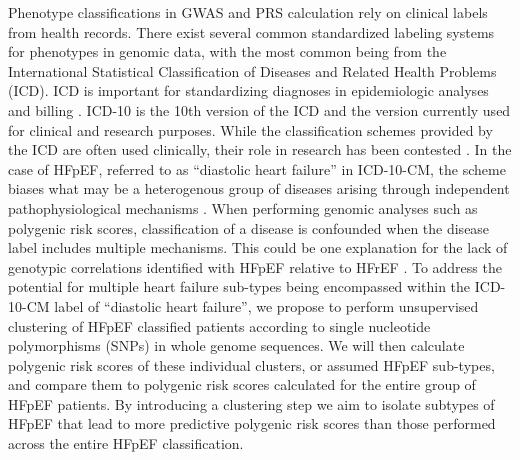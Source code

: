 \documentclass[11pt]{article}  %
\begin{document}
Phenotype classifications in GWAS and PRS calculation rely on clinical labels from health records. There exist several common standardized labeling systems for phenotypes in genomic data, with the most common being from the International Statistical Classification of Diseases and Related Health Problems (ICD). ICD is important for standardizing diagnoses in epidemiologic analyses and billing \cite{steindel_international_2010}. ICD-10 is the 10th version of the ICD and the version currently used for clinical and research purposes. While the classification schemes provided by the ICD are often used clinically, their role in research has been contested \cite{weiner_point_2018, cox_good_2009}. In the case of HFpEF, referred to as “diastolic heart failure” in ICD-10-CM, the scheme biases what may be a heterogenous group of diseases arising through independent pathophysiological mechanisms \cite{severino_structural_2020}. When performing genomic analyses such as polygenic risk scores, classification of a disease is confounded when the disease label includes multiple mechanisms. This could be one explanation for the lack of genotypic correlations identified with HFpEF relative to HFrEF \cite{andersson_association_2018}.
To address the potential for multiple heart failure sub-types being encompassed within the ICD-10-CM label of “diastolic heart failure”, we propose to perform unsupervised clustering of HFpEF classified patients according to single nucleotide polymorphisms (SNPs) in whole genome sequences. We will then calculate polygenic risk scores of these individual clusters, or assumed HFpEF sub-types, and compare them to polygenic risk scores calculated for the entire group of HFpEF patients. By introducing a clustering step we aim to isolate subtypes of HFpEF that lead to more predictive polygenic risk scores than those performed across the entire HFpEF classification.
\end{document}
